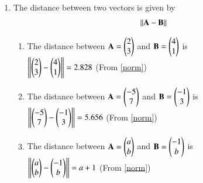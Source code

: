 \renewcommand{\theequation}{\theenumi}
\begin{enumerate}[label=\arabic*.,ref=\thesubsubsection.\theenumi]
\item The distance between two vectors is given by 
\begin{align}
\left\lVert\mathbf{A}-\mathbf{B}\right\rVert
\label{norm}
\end{align}
\begin{enumerate}
\item The distance between $\mathbf{A}=\begin{pmatrix}2\\3\end{pmatrix}$ and $\mathbf{B}=\begin{pmatrix}4\\1\end{pmatrix}$ is
\\
$\left\lVert\begin{pmatrix}2\\3\end{pmatrix}-\begin{pmatrix}4\\1\end{pmatrix}\right\rVert=2.828$
(From \eqref{norm})
\\
\item The distance between $\mathbf{A}=\begin{pmatrix}-5\\7\end{pmatrix}$ and $\mathbf{B}=\begin{pmatrix}-1\\3\end{pmatrix}$ is
\\
$\left\lVert\begin{pmatrix}-5\\7\end{pmatrix}-\begin{pmatrix}-1\\3\end{pmatrix}\right\rVert=5.656$
(From \eqref{norm})
\\
\item The distance between $\mathbf{A}=\begin{pmatrix}a\\b\end{pmatrix}$ and $\mathbf{B}=\begin{pmatrix}-1\\b\end{pmatrix}$ is
\\
$\left\lVert\begin{pmatrix}a\\b\end{pmatrix}-\begin{pmatrix}-1\\b\end{pmatrix}\right\rVert=a+1$
(From \eqref{norm})

\end{enumerate}
\end{enumerate}